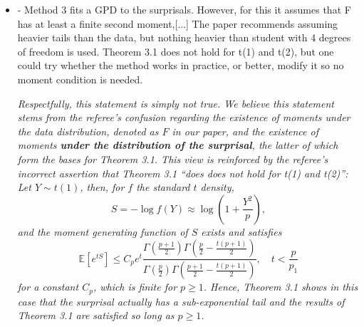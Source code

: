 \documentclass[a4paper,11pt]{article}
\begin{document}
\begin{itemize}
\begin{enumerate}
        \noindent\textit{Finding extreme surprisals under Method 2 requires one to accurately estimate an empirical quantile of the fitted surprisal distribution; e.g., the 10\% or 5\% quantile. As such, the method will only work when we have enough data to accurate estimate this quantile, which can be gauged by analyzing the range of the standard empirical  quantile confidence set based on the standard variance estimator: if this set is large, then the resulting method is unlikely to detect many true surprisals as the $\widehat{P}_n$ is simply too noisy to accurate estimate extreme quantiles.}

        \textit{Therefore, as with any statistical estimator, there is no singular sample size one can possibly point to and say that this will work well for all data types so long as the sample is larger than x. Instead, what matters is the variability of the data: the thicker the tails of the data the more data we need in order to accurately estimate extreme points. For instance, in the case where the data $Y$ is normally distributed, so that the surprisal $S=-\log f(Y)$ is chi-squared distributed, this method delivers accurate inferences after a few hundred observations. If instead, the the empirical quantile. Since the what matters is not so much how much data you hvae.}
    \end{enumerate}
  \item[-] - Method 3 fits a GPD to the surprisals. However, for this it assumes that F has at least a finite second moment,[...] The paper recommends assuming heavier tails than the data, but nothing heavier than student with 4 degrees of freedom is used. Theorem 3.1 does not hold for t(1) and t(2), but one could try whether the method works in practice, or better, modify it so no moment condition is needed.

    \noindent\textit{Respectfully, this statement is simply not true. We believe this statement stems from the referee's confusion regarding the existence of moments under the data distribution, denoted as $F$ in our paper, and the existence of moments \textbf{under the distribution of the surprisal}, the latter of which form the bases for Theorem 3.1. This view is reinforced by the referee's incorrect assertion that  Theorem 3.1 ``does does not hold for t(1) and t(2)'': Let $Y\sim t(1)$, then, for $f$ the standard $t$ density,
      $$
      S=-\log f(Y)\approx \log \left(1+\frac{Y^2}{p}\right),
      $$and the moment generating function of $S$ exists and satisfies
      $$
      \mathbb{E}\left[e^{t S}\right]\le C_p e^{t} \frac{\Gamma\left(\frac{p+1}{2}\right) \Gamma\left(\frac{p}{2}-\frac{t(p+1)}{2}\right)}{\Gamma\left(\frac{p}{2}\right) \Gamma\left(\frac{p+1}{2}-\frac{t(p+1)}{2}\right)},\quad t<\frac{p}{p_1}
    $$for a constant $C_p$, which is finite for $p\ge 1$. Hence, Theorem 3.1 shows in this case that the surprisal actually has a sub-exponential tail and the results of Theorem 3.1 are satisfied so long as $p\ge1$.}


\end{itemize}
\end{document}
